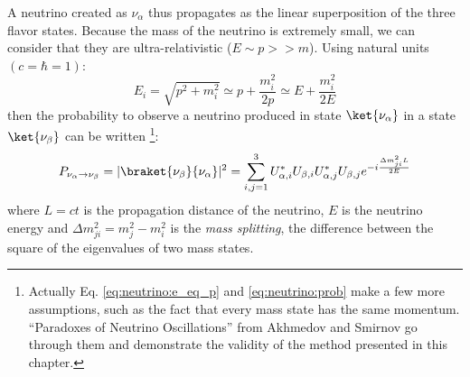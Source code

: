 \documentclass[../main.tex]{subfiles}
\begin{document}
A neutrino created as $\nu_\alpha$ thus propagates as the linear superposition of the three flavor states. Because the mass of the neutrino is extremely small, we can consider that they are ultra-relativistic ($E \sim p >> m$). Using natural units $(c = \hbar = 1)$:
\begin{equation}
  \label{eq:neutrino:e_eq_p}
  E_i = \sqrt{p^2 + m_i^2} \simeq p + \frac{m_i^2}{2p} \simeq E + \frac{m_i^2}{2E}
\end{equation}
then the probability to observe a neutrino produced in state $\ket{\nu_\alpha}$ in a state $\ket{\nu_\beta}$ can be written \footnote{Actually Eq. \ref{eq:neutrino:e_eq_p} and \ref{eq:neutrino:prob} make a few more assumptions, such as the fact that every mass state has the same momentum. ``Paradoxes of Neutrino Oscillations'' from Akhmedov and Smirnov \cite{akhmedov_paradoxes_2009} go through them and demonstrate the validity of the method presented in this chapter.}:
\begin{equation}
  \label{eq:neutrino:prob}
  P_{\nu_\alpha \rightarrow \nu_\beta} = | \braket{\nu_\beta}{\nu_\alpha} |^2 = \sum_{i,j=1}^3 U^*_{\alpha,i} U_{\beta,i} U^*_{\alpha, j} U_{\beta, j} e^{-i \frac{\Delta m^2_{ji} L}{2E}}
\end{equation}
where $L = ct$ is the propagation distance of the neutrino, $E$ is the neutrino energy and $\Delta m^2_{ji} = m^2_j - m^2_i$ is the \textit{mass splitting}, the difference between the square of the eigenvalues of two mass states.
\end{document}

